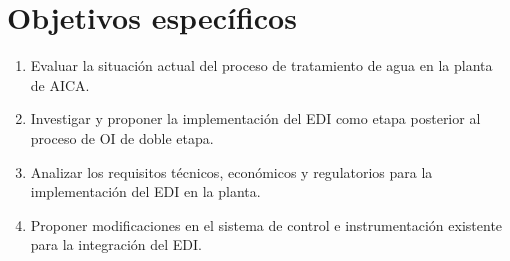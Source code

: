\section*{Objetivos específicos}
\begin{enumerate}
    \item Evaluar la situación actual del proceso de tratamiento de agua en la planta de AICA.
    \item Investigar y proponer la implementación del EDI como etapa posterior al proceso de OI de doble etapa.
    \item Analizar los requisitos técnicos, económicos y regulatorios para la implementación del EDI en la planta.
    \item Proponer modificaciones en el sistema de control e instrumentación existente para la integración del EDI.
\end{enumerate}
